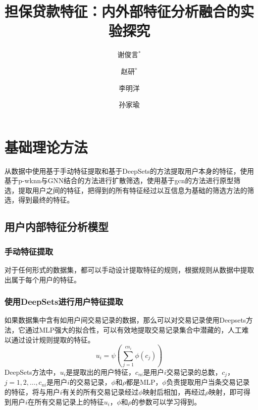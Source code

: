 \documentclass{article}
\title{担保贷款特征：内外部特征分析融合的实验探究}
\author{谢俊言$^*$ \and 赵研$^*$ \and 李明洋 \and 孙家瑜}
\begin{document}
\maketitle
{}
\section{基础理论方法}

从数据中使用基于手动特征提取和基于DeepSets的方法提取用户本身的特征，使用基于p-wknn与GNN结合的方法进行扩散筛选，使用基于gcn的方法进行原型筛选，提取用户之间的特征，把得到的所有特征经过以互信息为基础的筛选方法的筛选，得到最终的特征。

\subsection{用户内部特征分析模型}

\subsubsection{手动特征提取}

对于任何形式的数据集，都可以手动设计提取特征的规则，根据规则从数据中提取出属于每个用户的特征。

\subsubsection{使用DeepSets进行用户特征提取\cite{zaheer2017deep}}

如果数据集中含有如用户间交易记录的数据，那么可以对交易记录使用Deepsets方法，它通过MLP强大的拟合性，可以有效地提取交易记录集合中潜藏的，人工难以通过设计规则提取的特征。
\[
u_i = \psi\left(\sum_{j=1}^{c n_i} \phi(c_j)\right)
\]
DeepSets方法中，$u_i$是提取出的用户特征，$c_{ni}$是用户$i$交易记录的总数，$c_j$，$j=1,2,\ldots,c_{ni}$是用户$i$的交易记录，$\phi$和$\rho$都是MLP，$\phi$负责提取用户当条交易记录的特征，将与用户$i$有关的所有交易记录经过$\phi$映射后相加，再经过$\rho$映射，即可得到用户$i$在所有交易记录上的特征$u_i$，$\phi$和$\rho$的参数可以学习得到。
\end{document}
